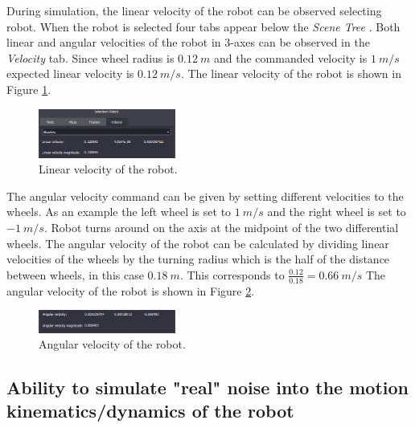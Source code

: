 \documentclass[11pt]{article}
\begin{document}
    During simulation, the linear velocity of the robot can be observed selecting robot. When the robot is selected four tabs appear below the \emph{Scene Tree} .
    Both linear and angular velocities of the robot in 3-axes can be observed in the \emph{Velocity} tab. Since wheel radius is $0.12 \ m$ and the commanded velocity is $1 \ m/s$ expected linear velocity is $0.12 \ m/s$. 
    The linear velocity of the robot is shown in Figure \ref{fig:linear}.

    \begin{figure}[ht!]
        \centering
        \includegraphics[width = 0.4\textwidth]{linear-velocity.PNG}
        \caption{Linear velocity of the robot.}
        \label{fig:linear}
    \end{figure}

    The angular velocity command can be given by setting different velocities to the wheels. As an example the left wheel is set to $1 \ m/s$ and the right wheel is set to $-1 \ m/s$. Robot turns around on the axis at the midpoint of the two differential wheels. The angular velocity of the robot can be calculated by dividing linear velocities of the wheels by the turning radius which is the half of the distance between wheels, in this case $0.18 \ m$. This corresponds to $\frac{0.12}{0.18} = 0.66 \ m/s$ The angular velocity of the robot is shown in Figure \ref{fig:angular}.

    \begin{figure}[ht!]
        \centering
        \includegraphics[width = 0.4\textwidth]{angular-velocity.PNG}
        \caption{Angular velocity of the robot.}
        \label{fig:angular}
    \end{figure}

    \subsection{Ability to simulate "real" noise into the motion kinematics/dynamics of the robot}
\end{document}

